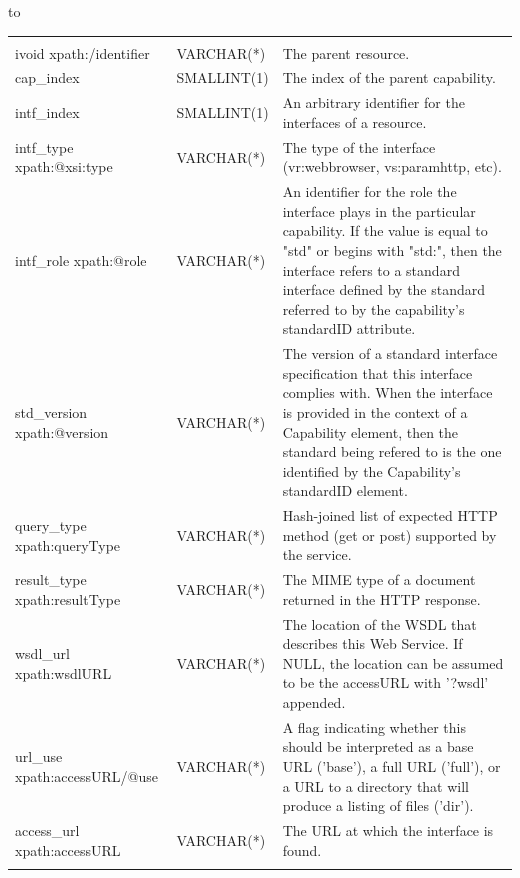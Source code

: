 \documentclass[11pt,a4paper]{ivoa}
\newcommand{\rtent}[1]{\texttt{\color{rtcolor} #1}}
\newenvironment{inlinetable}{\vfil\penalty8000\vfilneg%
    \hbox to\hsize\bgroup\hss}
  {\hss\egroup\vspace{8pt}}
\begin{document}
\begin{inlinetable}
\small
\begin{tabular}{p{}p{}p{}}\\
\hline
\noalign{\vspace{3pt}}
\multicolumn{3}{l}{\textit{Column names, utypes, ADQL types, and descriptions for the \rtent{rr.interface} table}}\\
\noalign{\vspace{2pt}}
\hline
\noalign{\vspace{2pt}}
ivoid\hfil\break
\scriptsize\ttfamily xpath:/identifier&
\footnotesize VARCHAR(*)&
The parent resource.\\
cap\_index\hfil\break
\scriptsize\ttfamily &
\footnotesize SMALLINT(1)&
The index of the parent capability.\\
intf\_index\hfil\break
\scriptsize\ttfamily &
\footnotesize SMALLINT(1)&
An arbitrary identifier for the interfaces of a resource.\\
intf\_type\hfil\break
\scriptsize\ttfamily xpath:@xsi:type&
\footnotesize VARCHAR(*)&
The type of the interface (vr:webbrowser, vs:paramhttp, etc).\\
intf\_role\hfil\break
\scriptsize\ttfamily xpath:@role&
\footnotesize VARCHAR(*)&
An identifier for the role the interface plays in the particular capability. If the value is equal to "std" or begins with "std:", then the interface refers to a standard interface defined by the standard referred to by the capability's standardID attribute.\\
std\_version\hfil\break
\scriptsize\ttfamily xpath:@version&
\footnotesize VARCHAR(*)&
The version of a standard interface specification that this interface complies with. When the interface is provided in the context of a Capability element, then the standard being refered to is the one identified by the Capability's standardID element.\\
query\_type\hfil\break
\scriptsize\ttfamily xpath:queryType&
\footnotesize VARCHAR(*)&
Hash-joined list of expected HTTP method (get or post) supported by the service.\\
result\_type\hfil\break
\scriptsize\ttfamily xpath:resultType&
\footnotesize VARCHAR(*)&
The MIME type of a document returned in the HTTP response.\\
wsdl\_url\hfil\break
\scriptsize\ttfamily xpath:wsdlURL&
\footnotesize VARCHAR(*)&
The location of the WSDL that describes this Web Service. If NULL, the location can be assumed to be the accessURL with '?wsdl' appended.\\
url\_use\hfil\break
\scriptsize\ttfamily xpath:accessURL/@use&
\footnotesize VARCHAR(*)&
A flag indicating whether this should be interpreted as a base URL ('base'), a full URL ('full'), or a URL to a directory that will produce a listing of files ('dir').\\
access\_url\hfil\break
\scriptsize\ttfamily xpath:accessURL&
\footnotesize VARCHAR(*)&
The URL at which the interface is found.\\

\noalign{\vspace{2pt}}
\hline
\end{tabular}
\end{inlinetable}
\end{document}
